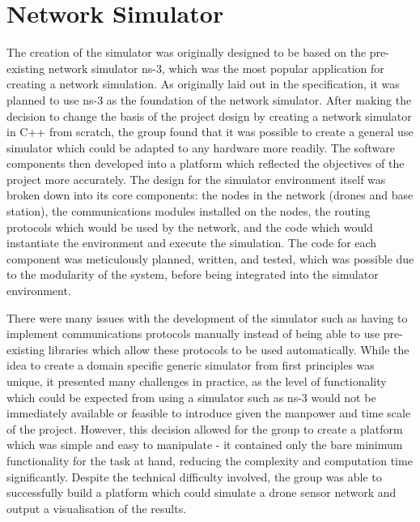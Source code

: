 \section{Network Simulator}
The creation of the simulator was originally designed to be based on the pre-existing network simulator ns-3, which was the most popular application for creating a network simulation. As originally laid out in the specification, it was planned to use ns-3 as the foundation of the network simulator. After making the decision to change the basis of the project design by creating a network simulator in C++ from scratch, the group found that it was possible to create a general use simulator which could be adapted to any hardware more readily. The software components then developed into a platform which reflected the objectives of the project more accurately. The design for the simulator environment itself was broken down into its core components: the nodes in the network (drones and base station), the communications modules installed on the nodes, the routing protocols which would be used by the network, and the code which would instantiate the environment and execute the simulation. The code for each component was meticulously planned, written, and tested, which was possible due to the modularity of the system, before being integrated into the simulator environment. 

There were many issues with the development of the simulator such as having to implement communications protocols manually instead of being able to use pre-existing libraries which allow these protocols to be used automatically. While the idea to create a domain specific generic simulator from first principles was unique, it presented many challenges in practice, as the level of functionality which could be expected from using a simulator such as ns-3 would not be immediately available or feasible to introduce given the manpower and time scale of the project. However, this decision allowed for the group to create a platform which was simple and easy to manipulate - it contained only the bare minimum functionality for the task at hand, reducing the complexity and computation time significantly. Despite the technical difficulty involved, the group was able to successfully build a platform which could simulate a drone sensor network and output a visualisation of the results.

